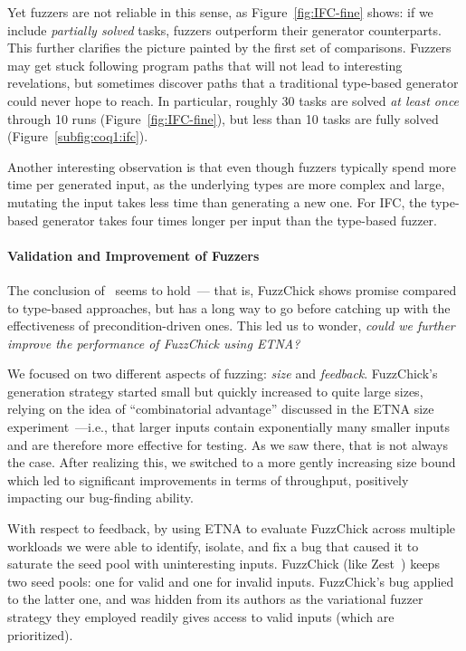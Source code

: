 Yet fuzzers are not reliable in this sense, as Figure~\ref{fig:IFC-fine} shows: if we
include \textit{partially solved} tasks, fuzzers outperform their generator
counterparts. This further clarifies the picture painted by the first set of
comparisons. Fuzzers may get stuck following program paths that will not lead to
interesting revelations, but sometimes discover paths that a traditional type-based
generator could never hope to reach. In particular, roughly 30 tasks are solved {\em at
    least once} through 10 runs (Figure~\ref{fig:IFC-fine}), but less than 10 tasks are
fully solved (Figure~\ref{subfig:coq1:ifc}).

Another interesting observation is that even though fuzzers typically spend more time
per generated input, as the underlying types are more complex and large, mutating the
input takes less time than generating a new one. For IFC, the type-based generator
takes four times longer per input than the type-based fuzzer.

\paragraph*{Validation and Improvement of
  Fuzzers}\label{evaluating-generators-rocq-fuzz-improve}

The conclusion of~\cite{FuzzChick} seems to hold~--- that is, FuzzChick shows promise
compared to type-based approaches, but has a long way to go before catching up with the
effectiveness of precondition-driven ones. This led us to wonder, {\em could we further
    improve the performance of FuzzChick using ETNA?}

We focused on two different aspects of fuzzing: {\em size} and {\em feedback}.
FuzzChick's generation strategy started small but quickly increased to quite large
sizes, relying on the idea of ``combinatorial advantage'' discussed in the ETNA size
experiment~\cite{etna-icfp23}---i.e., that larger inputs contain exponentially many
smaller inputs and are therefore more effective for testing. As we saw there, that is
not always the case. After realizing this, we switched to a more gently increasing size
bound which led to significant improvements in terms of throughput, positively
impacting our bug-finding ability.

With respect to feedback, by using ETNA to evaluate FuzzChick across multiple workloads
we were able to identify, isolate, and fix a bug that caused it to saturate the seed
pool with uninteresting inputs. FuzzChick (like Zest~\cite{Zest}) keeps two seed pools:
one for valid and one for invalid inputs. FuzzChick's bug applied to the latter one,
and was hidden from its authors as the variational fuzzer strategy they employed
readily gives access to valid inputs (which are prioritized).

